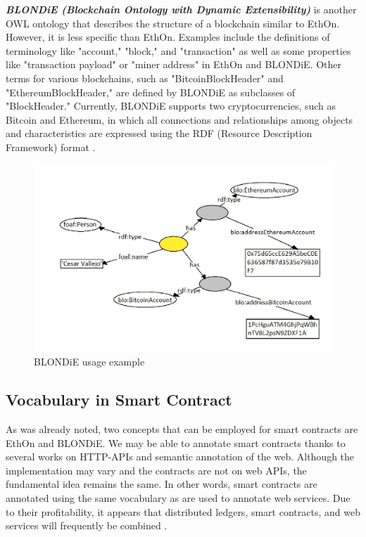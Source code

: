 \begin{center}
\begin{figure}[htb!]
		
	\end{figure}
	
\end{center}
\textbf{\textit{BLONDiE (Blockchain Ontology with Dynamic Extensibility)}} is another OWL ontology that describes the structure of a blockchain similar to EthOn. However, it is less specific than EthOn. Examples include the definitions of terminology like "account," "block," and "transaction" as well as some properties like "transaction payload" or "miner address" in EthOn and BLONDiE. Other terms for various blockchains, such as "BitcoinBlockHeader" and "EthereumBlockHeader," are defined by BLONDiE as subclasses of "BlockHeader." Currently, BLONDiE supports two cryptocurrencies, such as Bitcoin and Ethereum, in which all connections and relationships among objects and characteristics are expressed using the RDF (Resource Description Framework) format \cite{Third}.
\begin{center}
	\begin{figure}[htb!]
		
		\begin{minipage}{0.55\linewidth}
			\centering
			\includegraphics[width=1.75\textwidth]{images/chap02_BLONDiE.png}
		\end{minipage}
		\caption[BLONDiE]{BLONDiE usage example \cite{Hector}}
		
		
	\end{figure}
	
\end{center}
\subsection{Vocabulary in Smart Contract}
As was already noted, two concepts that can be employed for smart contracts are EthOn and BLONDiE. We may be able to annotate smart contracts thanks to several works on HTTP-APIs and semantic annotation of the web. Although the implementation may vary and the contracts are not on web APIs, the fundamental idea remains the same. In other words, smart contracts are annotated using the same vocabulary as are used to annotate web services. Due to their profitability, it appears that distributed ledgers, smart contracts, and web services will frequently be combined \cite{Third}.

